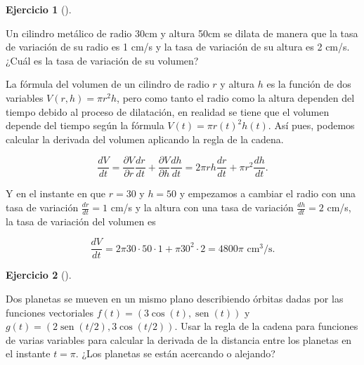 \documentclass[
  a4paper,
]{scrreport}
\theoremstyle{definition}
\newtheorem{exercise}{Ejercicio}[chapter]
\theoremstyle{remark}
\begin{document}
\begin{exercise}[]\protect\hypertarget{exr-variacion-volumen-cilindro}{}\label{exr-variacion-volumen-cilindro}

Un cilindro metálico de radio 30cm y altura 50cm se dilata de manera que
la tasa de variación de su radio es 1 cm/s y la tasa de variación de su
altura es 2 cm/s. ¿Cuál es la tasa de variación de su volumen?

\end{exercise}

\begin{tcolorbox}[enhanced jigsaw, coltitle=black, toptitle=1mm, colframe=quarto-callout-tip-color-frame, colbacktitle=quarto-callout-tip-color!10!white, breakable, opacityback=0, bottomtitle=1mm, opacitybacktitle=0.6, title=\textcolor{quarto-callout-tip-color}{\faLightbulb}\hspace{0.5em}{Solución}, arc=.35mm, leftrule=.75mm, toprule=.15mm, titlerule=0mm, bottomrule=.15mm, left=2mm, rightrule=.15mm, colback=white]

La fórmula del volumen de un cilindro de radio \(r\) y altura \(h\) es
la función de dos variables \(V(r,h) = \pi r^2h\), pero como tanto el
radio como la altura dependen del tiempo debido al proceso de
dilatación, en realidad se tiene que el volumen depende del tiempo según
la fórmula \(V(t) = \pi r(t)^2 h(t)\). Así pues, podemos calcular la
derivada del volumen aplicando la regla de la cadena.

\[
\frac{dV}{dt}
= \frac{\partial V}{\partial r}\frac{dr}{dt} + \frac{\partial V}{\partial h}\frac{dh}{dt}
= 2\pi rh \frac{dr}{dt} + \pi r^2 \frac{dh}{dt}.
\]

Y en el instante en que \(r=30\) y \(h=50\) y empezamos a cambiar el
radio con una tasa de variación \(\frac{dr}{dt}=1\) cm/s y la altura con
una tasa de variación \(\frac{dh}{dt}=2\) cm/s, la tasa de variación del
volumen es

\[
\frac{dV}{dt}
= 2\pi 30\cdot 50\cdot 1 + \pi 30^2 \cdot 2 
= 4800 \pi \mbox{ cm$^3$/s}.
\]

\end{tcolorbox}

\begin{exercise}[]\protect\hypertarget{exr-distancia-planetas}{}\label{exr-distancia-planetas}

Dos planetas se mueven en un mismo plano describiendo órbitas dadas por
las funciones vectoriales \(f(t) = (3 \cos(t), \operatorname{sen}(t))\)
y \(g(t) = (2\operatorname{sen}(t/2), 3\cos(t/2))\). Usar la regla de la
cadena para funciones de varias variables para calcular la derivada de
la distancia entre los planetas en el instante \(t=\pi\). ¿Los planetas
se están acercando o alejando?

\end{exercise}
\end{document}
